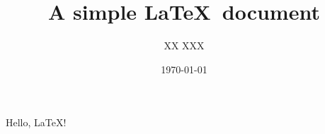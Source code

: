 \documentclass[a4paper]{article}
\title{A simple \LaTeX\ document}
\author{XX XXX}
\date{\today}
\begin{document}
	\maketitle
	Hello, \LaTeX !
\end{document}
